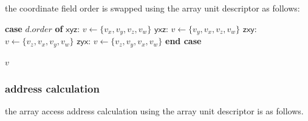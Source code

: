 \par\noindent
the coordinate field order is swapped using the array unit descriptor as follows:

\begin{algorithm}[H]
\footnotesize
\caption{swap field order using array unit descriptor and coordinate vector}
\begin{algorithmic}[1]

  \State \textbf{case} $\mathit{d.order}$ \textbf{of}
  \State \hspace{1em} $\mathsf{xyz}$: $v \gets \{ v_x, v_y, v_z, v_w \}$
  \State \hspace{1em} $\mathsf{yxz}$: $v \gets \{ v_y, v_x, v_z, v_w \}$
  \State \hspace{1em} $\mathsf{zxy}$: $v \gets \{ v_z, v_x, v_y, v_w \}$
  \State \hspace{1em} $\mathsf{zyx}$: $v \gets \{ v_z, v_y, v_x, v_w \}$
  \State \textbf{end case}

  \State \Return $v$

\EndFunction
\end{algorithmic}
\end{algorithm}

\subsubsection{address calculation}

the array access address calculation using the array unit descriptor is as follows.

